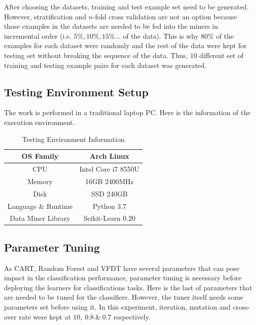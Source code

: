 \documentclass[sigplan]{acmart}\settopmatter{printfolios=true,printccs=false,printacmref=false}
\begin{document}
After choosing the datasets, training and test example set need to be generated. However, stratification and $n$-fold cross validation are not an option because those examples in the datasets are needed to be fed into the miners in incremental order (i.e. $5\%, 10\%, 15\%... $ of the data). This is why $80\%$ of the examples for each dataset were randomly and the rest of the data were kept for testing set without breaking the sequence of the data. Thus, $10$ different set of training and testing example pairs for each dataset was generated. 

\subsection{Testing Environment Setup}
The work is performed in a traditional laptop PC. Here is the information of the execution environment.

\begin{center}
	\begin{table}[h]
		\begin{tabular}{|c|c|}
			\hline 
			OS Family & Arch Linux \\
			\hline 
			CPU & Intel Core i7 8550U \\ 
			\hline 
			Memory & 16GB 2400MHz \\ 
			\hline 
			Disk & SSD 240GB \\ 
			\hline 
			Language \& Runtime & Python 3.7 \\ 
			\hline 
			Data Miner Library & Scikit-Learn 0.20 \\ 
			\hline  
		\end{tabular} 
	\caption{Testing Environment Information}
	\label{tab:testbed}
	\end{table}
\end{center}

\subsection{Parameter Tuning}
As CART, Random Forest and VFDT have several parameters that can pose impact in the classification performance, parameter tuning is necessary before deploying the learners for classifications tasks. Here is the last of parameters that are needed to be tuned for the classifiers. However, the tuner itself needs some parameters set before using it. In this experiment, iteration, mutation and cross-over rate were kept at $10, \  0.8 \ \& \ 0.7$ respectively.
\end{document}
